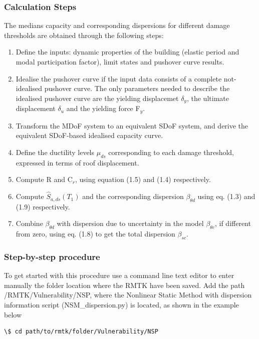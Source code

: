 \subsubsection{Calculation Steps}
\label{subsec:CalculationSteps}
The medians capacity and corresponding dispersions for different damage thresholds are obtained through the following steps:

\begin{enumerate}
\item Define the inputs: dynamic properties of the building (elastic period and modal participation factor), limit states and pushover curve results.
\item Idealise the pushover curve if the input data consists of a complete not-idealised pushover curve. The only parameters needed to describe the idealised pushover curve are the yielding displacemet $\delta_y$, the ultimate displacement $\delta_u$ and the yielding force F$_y$.
\item Transform the MDoF system to an equivalent SDoF system, and derive the equivalent SDoF-based idealised capacity curve.
\item Define the ductility levels $\mu_{ds}$ corresponding to each damage threshold, expressed in terms of roof displacement.
\item Compute R and C$_r$, using equation (1.5) and (1.4) respectively.
\item Compute $\hat{S}_{a,ds}(T_1)$ and the corresponding dispersion  $\beta_{\theta d}$ using eq. (1.3) and (1.9) respectively.
\item Combine $\beta_{\theta d}$ with dispersion due to uncertainty in the model $\beta_{\theta c}$, if different from zero, using eq. (1.8) to get the total dispersion $\beta_{sc}$.
\end{enumerate}

\subsubsection{Step-by-step procedure}
To get started with this procedure use a command line text editor to enter manually the folder location where the RMTK have been saved. Add the path /RMTK/Vulnerability/NSP, where the Nonlinear Static Method with dispersion information script (NSM\_dispersion.py) is located, as shown in the example below

\begin{Verbatim}[frame=single, commandchars=\\\{\}, samepage=true]
\$ cd path/to/rmtk/folder/Vulnerability/NSP
\end{Verbatim}

